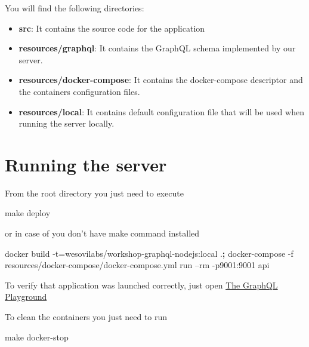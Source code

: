 \documentclass[]{book}
\newenvironment{Shaded}{\begin{snugshade}}{\end{snugshade}}
\newcommand{\KeywordTok}[1]{\textcolor[rgb]{0.13,0.29,0.53}{\textbf{#1}}}
\newcommand{\FunctionTok}[1]{\textcolor[rgb]{0.00,0.00,0.00}{#1}}
\newcommand{\ExtensionTok}[1]{#1}
\newcommand{\NormalTok}[1]{#1}
\begin{document}
You will find the following directories:

\begin{itemize}
\item
  \textbf{src}: It contains the source code for the application
\item
  \textbf{resources/graphql}: It contains the GraphQL schema implemented
  by our server.
\item
  \textbf{resources/docker-compose}: It contains the docker-compose
  descriptor and the containers configuration files.
\item
  \textbf{resources/local}: It contains default configuration file that
  will be used when running the server locally.
\end{itemize}

\section{Running the server}\label{running-the-server}

From the root directory you just need to execute

\begin{Shaded}
\begin{Highlighting}[]
\FunctionTok{make}\NormalTok{ deploy}
\end{Highlighting}
\end{Shaded}

or in case of you don't have make command installed

\begin{Shaded}
\begin{Highlighting}[]
\ExtensionTok{docker}\NormalTok{ build -t=wesovilabs/workshop-graphql-nodejs:local .}\KeywordTok{;}
\ExtensionTok{docker-compose}\NormalTok{ -f resources/docker-compose/docker-compose.yml run --rm -p9001:9001 api}
\end{Highlighting}
\end{Shaded}

To verify that application was launched correctly, just open
\href{http://localhost:9001/graphql}{The GraphQL Playground}

To clean the containers you just need to run

\begin{Shaded}
\begin{Highlighting}[]
\FunctionTok{make}\NormalTok{ docker-stop}
\end{Highlighting}
\end{Shaded}
\end{document}
